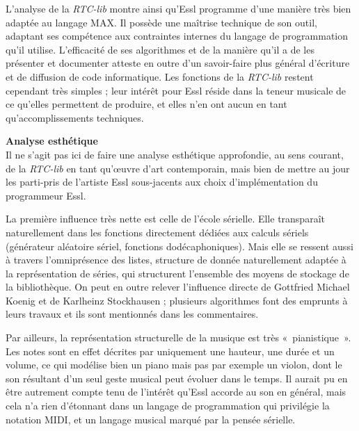 \documentclass[a4paper,12pt]{article}
\newcommand{\guill}[1]{«~#1~»}
\begin{document}
L'analyse de la \emph{RTC-lib} montre ainsi qu'Essl programme d'une manière très bien adaptée au langage MAX. Il possède une maîtrise technique de son outil, adaptant ses compétence aux contraintes internes du langage de programmation qu'il utilise. L'efficacité de ses algorithmes et de la manière qu'il a de les présenter et documenter atteste en outre d'un savoir-faire plus général d'écriture et de diffusion de code informatique. Les fonctions de la \emph{RTC-lib} restent cependant très simples ; leur intérêt pour Essl réside dans la teneur musicale de ce qu'elles permettent de produire, et elles n'en ont aucun en tant qu'accomplissements techniques. 

\textbf{Analyse esthétique} \\
Il ne s'agit pas ici de faire une analyse esthétique approfondie, au sens courant, de la \emph{RTC-lib} en tant qu'œuvre d'art contemporain, mais bien de mettre au jour les parti-pris de l'artiste Essl sous-jacents aux choix d'implémentation du programmeur Essl.

La première influence très nette est celle de l'école sérielle. Elle transparaît naturellement dans les fonctions directement dédiées aux calculs sériels (générateur aléatoire sériel, fonctions dodécaphoniques). Mais elle se ressent aussi à travers l'omniprésence des listes, structure de donnée naturellement adaptée à la représentation de séries, qui structurent l'ensemble des moyens de stockage de la bibliothèque. On peut en outre relever l'influence directe de Gottfried Michael Koenig et de Karlheinz Stockhausen ; plusieurs algorithmes font des emprunts à leurs travaux et ils sont mentionnés dans les commentaires.

Par ailleurs, la représentation structurelle de la musique est très \guill{pianistique}. Les notes sont en effet décrites par uniquement une hauteur, une durée et un volume, ce qui modélise bien un piano mais pas par exemple un violon, dont le son résultant d'un seul geste musical peut évoluer dans le temps. Il aurait pu en être autrement compte tenu de l'intérêt qu'Essl accorde au son en général, mais cela n'a rien d'étonnant dans un langage de programmation qui privilégie la notation MIDI, et un langage musical marqué par la pensée sérielle.
\end{document}
